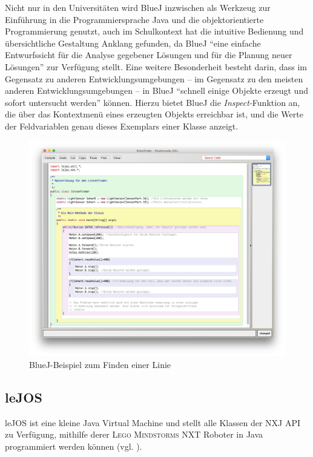 \documentclass[paper=a4, DIV=calc, BCOR=12mm, twoside=on, onecolumn=on, open = right, titlepage =on, parskip =half-, headsepline = on, footsepline = off, chapterprefix = off, appendixprefix = on, fontsize = 12pt, numbers = noenddot, abstract = on]{scrbook}
\begin{document}
Nicht nur in den Universitäten wird BlueJ inzwischen als Werkzeug zur Einführung in die Programmiersprache Java und die objektorientierte Programmierung genutzt, auch im Schulkontext hat die intuitive Bedienung und übersichtliche Gestaltung Anklang gefunden, da BlueJ "`eine einfache Entwurfssicht für die Analyse gegebener Lösungen und für die Planung neuer Lösungen"' \cite[S.6]{ehmann:09} zur Verfügung stellt. Eine weitere Besonderheit besteht darin, dass im Gegensatz zu anderen Entwicklungsumgebungen -- im Gegensatz zu den meisten anderen Entwicklungsumgebungen -- in BlueJ "`schnell einige Objekte erzeugt und sofort untersucht werden"' \cite[S.6]{ehmann:09} können. Hierzu bietet BlueJ die \emph{Inspect-}Funktion an, die über das Kontextmenü eines erzeugten Objekts erreichbar ist, und die Werte der Feldvariablen genau dieses Exemplars einer Klasse anzeigt.
\vspace*{-2ex}
\begin{figure}[htpb]
\centering
\includegraphics[width=\textwidth]{images/linienfinder_bluej.png} 
\caption{BlueJ-Beispiel zum Finden einer Linie}
\label{fig:Bsp BlueJ Linienfinder}
\end{figure}


\par \singlespacing
\subsection{leJOS}
\label{sec:lejos}
\onehalfspacing
leJOS ist eine kleine Java Virtual Machine und stellt alle Klassen der NXJ API zu Verfügung, mithilfe derer \textsc{Lego Mindstorms} NXT Roboter in Java programmiert werden können (vgl. \cite{lejos}).
\end{document}
